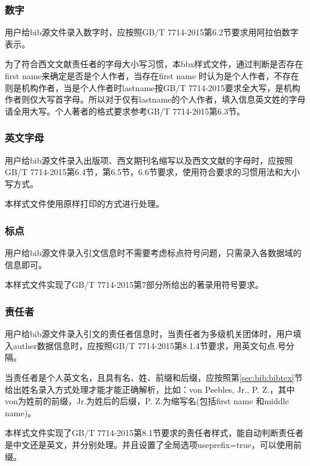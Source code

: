 \subsubsection{数字}

\begin{property}{}{}
用户给bib源文件录入数字时，应按照GB/T 7714-2015第6.2节要求用阿拉伯数字表示。

为了符合西文文献责任者的字母大小写习惯，本bbx样式文件，通过判断是否存在first name来确定是否是个人作者，当存在first name 时认为是个人作者，不存在则是机构作者，当是个人作者时lastname按GB/T 7714-2015要求全大写，是机构作者则仅大写首字母。所以对于仅有lastname的个人作者，填入信息英文姓的字母请全用大写。个人著者的格式要求参考GB/T 7714-2015第6.3节。
\end{property}

\subsubsection{英文字母}

\begin{property}{}{}
用户给bib源文件录入出版项、西文期刊名缩写以及西文文献的字母时，应按照GB/T 7714-2015第6.4节，第6.5节，6.6节要求，使用符合要求的习惯用法和大小写方式。

本样式文件使用原样打印的方式进行处理。
\end{property}

\subsubsection{标点}

\begin{property}{}{}
用户给bib源文件录入引文信息时不需要考虑标点符号问题，只需录入各数据域的信息即可。

本样式文件实现了GB/T 7714-2015第7部分所给出的著录用符号要求。
\end{property}

\subsubsection{责任者}

\begin{property}{}{}
用户给bib源文件录入引文的责任者信息时，当责任者为多级机关团体时，用户填入auther数据信息时，应按照GB/T 7714-2015第8.1.4节要求，用英文句点.号分隔。

当责任者是个人英文名，且具有名、姓、前缀和后缀，应按照第\ref{sec:bib:bibtex}节给出姓名录入方式处理才能才能正确解析，比如：von Peebles, Jr., P. Z.，其中von为姓前的前缀，Jr.为姓后的后缀，P. Z.为缩写名(包括first name 和middle name)。

本样式文件实现了GB/T 7714-2015第8.1节要求的责任者样式，能自动判断责任者是中文还是英文，并分别处理。并且设置了全局选项useprefix=true，可以使用前缀。
\end{property}

